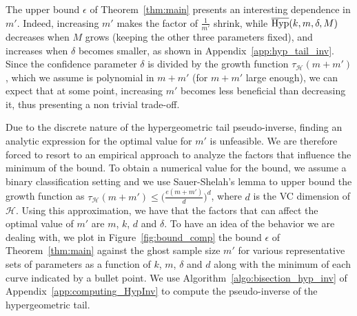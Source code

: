 \documentclass[twoside,11pt]{article}
\renewcommand{\H}{{\mathcal{H}}}
\newcommand{\HypInv}{\overline{\textnormal{Hyp}}}
\begin{document}
The upper bound $\epsilon$ of Theorem~\ref{thm:main} presents an interesting dependence in $m'$.
Indeed, increasing $m'$ makes the factor of $\frac{1}{m'}$ shrink, while $\HypInv(k,m,\delta,M)$ decreases when $M$ grows (keeping the other three parameters fixed), and increases when $\delta$ becomes smaller, as shown in Appendix~\ref{app:hyp_tail_inv}.
Since the confidence parameter $\delta$ is divided by the growth function $\tau_\H(m+m')$, which we assume is polynomial in $m+m'$ (for $m+m'$ large enough), we can expect that at some point, increasing $m'$ becomes less beneficial than decreasing it, thus presenting a non trivial trade-off.

Due to the discrete nature of the hypergeometric tail pseudo-inverse, finding an analytic expression for the optimal value for $m'$ is unfeasible.
We are therefore forced to resort to an empirical approach to analyze the factors that influence the minimum of the bound.
To obtain a numerical value for the bound, we assume a binary classification setting and we use Sauer-Shelah's lemma to upper bound the growth function as $\tau_\H(m+m') \le \big(\frac{e(m+m')}{d}\big)^d$, where $d$ is the VC dimension of $\H$.
Using this approximation, we have that the factors that can affect the optimal value of $m'$ are $m$, $k$, $d$ and $\delta$.
To have an idea of the behavior we are dealing with, we plot in Figure~\ref{fig:bound_comp} the bound $\epsilon$ of Theorem~\ref{thm:main} against the ghost sample size $m'$ for various
representative sets of parameters as a function of $k$, $m$, $\delta$ and $d$ along with the minimum of each curve indicated by a bullet point.
We use Algorithm~\ref{algo:bisection_hyp_inv} of Appendix~\ref{app:computing_HypInv} to compute the pseudo-inverse of the hypergeometric tail.
\end{document}
